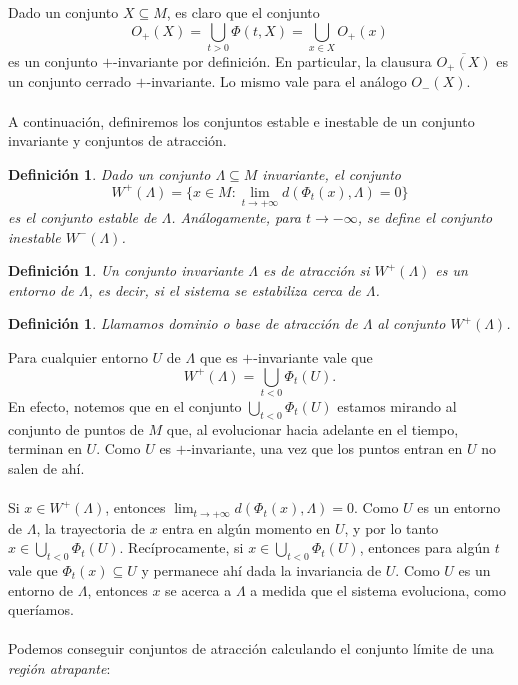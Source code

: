 \documentclass[12pt,a4paper]{article}
\newtheorem{definition}[theorem]{Definición}
\begin{document}
Dado un conjunto $X \subseteq M$, es claro que el conjunto 
\[
O_{+}(X) = \displaystyle \bigcup_{t>0} \Phi(t,X) = \bigcup_{x \in X} O_+(x)
\]
es un conjunto $+$-invariante por definición. En particular, la clausura $\overline{O_{+}(X)}$ es un conjunto cerrado $+$-invariante. Lo mismo vale para el análogo $O_-(X)$.
\\
\\
A continuación, definiremos los conjuntos estable e inestable de un conjunto invariante y conjuntos de atracción.
\begin{definition}
    Dado un conjunto $\Lambda \subseteq M$ invariante, el conjunto
    \[
    W^+(\Lambda) = \{x \in M : \lim_{t \to + \infty} d(\Phi_t(x), \Lambda) = 0 \}
    \]
    es el conjunto \textit{estable} de $\Lambda$. Análogamente, para $t \rightarrow -\infty$, se define el conjunto \textit{inestable} $W^-(\Lambda)$.
\end{definition}
\begin{definition}
    Un conjunto invariante $\Lambda$ es \textit{de atracción} si $W^+(\Lambda)$ es un entorno de $\Lambda$, es decir, si el sistema se estabiliza cerca de $\Lambda$.
\end{definition}
\begin{definition}
    Llamamos dominio o base de atracción de $\Lambda$ al conjunto $W^+(\Lambda)$.
\end{definition}
Para cualquier entorno $U$ de $\Lambda$ que es $+$-invariante vale que
\[
\displaystyle W^+(\Lambda) = \bigcup_{t<0}\Phi_t(U).
\]
En efecto, notemos que en el conjunto $\displaystyle \bigcup_{t<0}\Phi_t(U)$ estamos mirando al conjunto de puntos de $M$ que, al evolucionar hacia adelante en el tiempo, terminan en $U$. Como $U$ es $+$-invariante, una vez que los puntos entran en $U$ no salen de ahí.
\\
\\
Si $x \in W^+(\Lambda)$, entonces $\displaystyle \lim_{t \rightarrow +\infty} d(\Phi_t(x), \Lambda) = 0$. Como $U$ es un entorno de $\Lambda$, la trayectoria de $x$ entra en algún momento en $U$, y por lo tanto $x \in \displaystyle \bigcup_{t<0}\Phi_t(U)$.
Recíprocamente, si $x \in \displaystyle \bigcup_{t<0}\Phi_t(U)$, entonces para algún $t$ vale que $\Phi_t(x) \subseteq U$ y permanece ahí dada la invariancia de $U$. Como $U$ es un entorno de $\Lambda$, entonces $x$ se acerca a $\Lambda$ a medida que el sistema evoluciona, como queríamos.
\\
\\
Podemos conseguir conjuntos de atracción calculando el conjunto límite de una \textit{región atrapante}:
\end{document}
